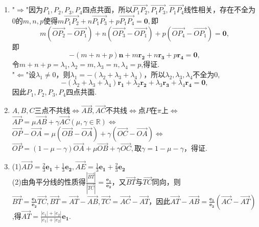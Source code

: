 \documentclass[UTF8]{ctexart}
\begin{document}
\begin{enumerate}
\item "$\Rightarrow$"因为$P_1,P_2,P_3,P_4$四点共面，所以$\overrightarrow{P_{1}P_{2}},\overrightarrow{P_{1}P_{3}},\overrightarrow{P_{1}P_{4}}$线性相关，存在不全为$0$的$m,n,p$使得$m\overrightarrow{P_{1}P_{2}}+n\overrightarrow{P_{1}P_{3}}+p\overrightarrow{P_{1}P_{4}}=\mathbf{0},$即$$m\left(\overrightarrow{OP_2}-\overrightarrow{OP_1}\right)+n\left(\overrightarrow{OP_3}-\overrightarrow{OP_1}\right)+p\left(\overrightarrow{OP_4}-\overrightarrow{OP_1}\right)=\mathbf{0},$$即$$-\left(m+n+p\right)\mathbf{n}+m\mathbf{r_2}+n\mathbf{r_3}+p\mathbf{r_4}=\mathbf{0},$$令$m+n+p=\lambda_1,\lambda_2=m,\lambda_3=n,\lambda_4=p$,得证. \\
"$\Leftarrow$"设$\lambda_1\neq0$，则$\lambda_1=-\left(\lambda_2+\lambda_3+\lambda_4\right)$，所以$\lambda_2,\lambda_3,\lambda_4$不全为$0$,$$-\left(\lambda_2+\lambda_3+\lambda_4\right)\mathbf{r_1}+\lambda_2\mathbf{r_2}+\lambda_3\mathbf{r_3}+\lambda_4\mathbf{r_4}=\mathbf{0},$$因此$P_1,P_2,P_3,P_4$四点共面. 

\item $A,B,C$三点不共线$\Leftrightarrow$$\overrightarrow{AB},\overrightarrow{AC}$不共线$\Leftrightarrow$点$P$在$\pi$上$\Leftrightarrow$$\overrightarrow{AP}=\mu\overrightarrow{AB}+\gamma\overrightarrow{AC}\left(\mu,\gamma\in \mathbb{R}\right)$$\Leftrightarrow$$\overrightarrow{OP}-\overrightarrow{OA}=\mu\left(\overrightarrow{OB}-\overrightarrow{OA}\right)+\gamma\left(\overrightarrow{OC}-\overrightarrow{OA}\right)$$\Leftrightarrow$$\overrightarrow{OP}=\left(1-\mu-\gamma\right)\overrightarrow{OA}+\mu\overrightarrow{OB}+\gamma\overrightarrow{OC},$取$\gamma=1-\mu-\gamma$，得证. 

\item (1)$\overrightarrow{AD}=\displaystyle\frac{2}{3}\mathbf{e_1}+\displaystyle\frac{1}{3}\mathbf{e_2},\overrightarrow{AE}=\displaystyle\frac{1}{3}\mathbf{e_1}+\displaystyle\frac{2}{3}\mathbf{e_2}$\\
(2)由角平分线的性质得$\displaystyle\frac{\left|\overrightarrow{BT}\right|}{\left|\overrightarrow{TC}\right|}=\displaystyle\frac{\mathbf{e_1}}{\mathbf{e_2}}$，又$\overrightarrow{BT}$与$\overrightarrow{TC}$同向，则$\overrightarrow{BT}=\displaystyle\frac{\mathbf{e_1}}{\mathbf{e_2}}\overrightarrow{TC},\overrightarrow{BT}=\overrightarrow{AT}-\overrightarrow{AB},\overrightarrow{TC}=\overrightarrow{AC}-\overrightarrow{AT}$，因此$\overrightarrow{AT}-\overrightarrow{AB}=\displaystyle\frac{\mathbf{e_1}}{\mathbf{e_2}}\left(\overrightarrow{AC}-\overrightarrow{AT}\right)$,得$\overrightarrow{AT}=\displaystyle\frac{\left|e_1\right|+\left|e_2\right|}{\left|e_1\right|+\left|e_2\right|}\mathbf{e_1}$. 
\end{enumerate}
\end{document}
